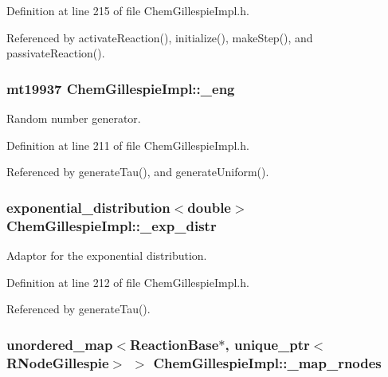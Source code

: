 Definition at line 215 of file Chem\+Gillespie\+Impl.\+h.



Referenced by activate\+Reaction(), initialize(), make\+Step(), and passivate\+Reaction().

\hypertarget{classChemGillespieImpl_a27162663b9cf776971f2f32483c6fe95}{
\subsubsection[{\+\_\+eng}]{\setlength{\rightskip}{0pt plus 5cm}mt19937 Chem\+Gillespie\+Impl\+::\+\_\+eng\hspace{0.3cm}{\ttfamily [private]}}}\label{classChemGillespieImpl_a27162663b9cf776971f2f32483c6fe95}


Random number generator. 



Definition at line 211 of file Chem\+Gillespie\+Impl.\+h.



Referenced by generate\+Tau(), and generate\+Uniform().

\hypertarget{classChemGillespieImpl_a6ea99580ca00386e7db98a4059fbed0c}{
\subsubsection[{\+\_\+exp\+\_\+distr}]{\setlength{\rightskip}{0pt plus 5cm}exponential\+\_\+distribution$<$double$>$ Chem\+Gillespie\+Impl\+::\+\_\+exp\+\_\+distr\hspace{0.3cm}{\ttfamily [private]}}}\label{classChemGillespieImpl_a6ea99580ca00386e7db98a4059fbed0c}


Adaptor for the exponential distribution. 



Definition at line 212 of file Chem\+Gillespie\+Impl.\+h.



Referenced by generate\+Tau().

\hypertarget{classChemGillespieImpl_ab8d6bcef48ea219a249cebdb436dbc30}{
\subsubsection[{\+\_\+map\+\_\+rnodes}]{\setlength{\rightskip}{0pt plus 5cm}unordered\+\_\+map$<${\bf Reaction\+Base}$\ast$, unique\+\_\+ptr$<${\bf R\+Node\+Gillespie}$>$ $>$ Chem\+Gillespie\+Impl\+::\+\_\+map\+\_\+rnodes\hspace{0.3cm}{\ttfamily [private]}}}\label{classChemGillespieImpl_ab8d6bcef48ea219a249cebdb436dbc30}


